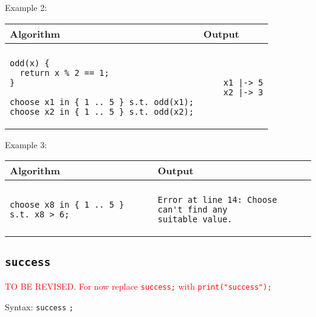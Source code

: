 \documentclass[a4paper]{report}
\begin{document}
Example 2:
\begin{center}
\begin{tabular}{ll}
Algorithm & Output\\
\hline
\\
\begin{minipage}{.45\textwidth}
\begin{verbatim}
odd(x) {
  return x % 2 == 1;
}

choose x1 in { 1 .. 5 } s.t. odd(x1);
choose x2 in { 1 .. 5 } s.t. odd(x2);
\end{verbatim}
\end{minipage}
&
\begin{minipage}{.45\textwidth}
\begin{verbatim}
    x1 |-> 5
    x2 |-> 3
\end{verbatim}
\end{minipage}
\end{tabular}
\end{center}

Example 3:
\begin{center}
\begin{tabular}{ll}
Algorithm & Output\\
\hline
\\
\begin{minipage}{.45\textwidth}
\begin{verbatim}
choose x8 in { 1 .. 5 } s.t. x8 > 6;
\end{verbatim}
\end{minipage}
&
\begin{minipage}{.45\textwidth}
\begin{verbatim}
Error at line 14: Choose can't find any 
suitable value.
\end{verbatim}
\end{minipage}
\end{tabular}
\end{center}


\subsection{\texttt{success}}

\textcolor{red}{TO BE REVISED. For now replace \texttt{success;} with \texttt{print("success");}}

Syntax: \verb"success" \verb";"
\end{document}
